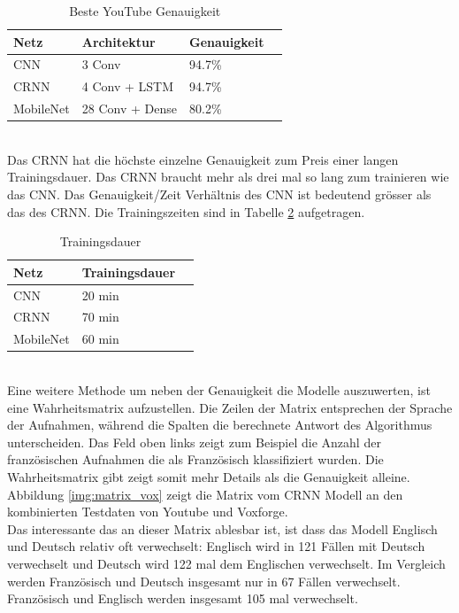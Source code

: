 \begin{table}[h]
	\centering
	\begin{tabular}{llll}
		\hline
		Netz & Architektur     & Genauigkeit  \\ \hline
		CNN  & 3 Conv          & 94.7\%       \\
		CRNN & 4 Conv + LSTM   & 94.7\%     \\
		MobileNet  & 28 Conv + Dense & 80.2\%   \\ \hline
	\end{tabular}
	\caption{Beste YouTube Genauigkeit}
	\label{table:test_you}
\end{table}
\\
Das CRNN hat die höchste einzelne Genauigkeit zum Preis einer langen Trainingsdauer. Das CRNN braucht mehr als drei mal so lang zum trainieren wie das CNN. Das Genauigkeit/Zeit Verhältnis des CNN ist bedeutend grösser als das des CRNN. Die Trainingszeiten sind in Tabelle \ref{table:test_time} aufgetragen.
\begin{table}[h]
	\centering
	\begin{tabular}{lll}
		\hline
		Netz & Trainingsdauer \\ \hline
		CNN  & 20 min \\
		CRNN & 70 min \\
		MobileNet  & 60 min\\ \hline
	\end{tabular}
	\caption{Trainingsdauer}
	\label{table:test_time}
\end{table}
\\
Eine weitere Methode um neben der Genauigkeit die Modelle auszuwerten, ist eine Wahrheitsmatrix aufzustellen. Die Zeilen der Matrix entsprechen der Sprache der Aufnahmen, während die Spalten die berechnete Antwort des Algorithmus unterscheiden. Das Feld oben links zeigt zum Beispiel die Anzahl der französischen Aufnahmen die als Französisch klassifiziert wurden. Die Wahrheitsmatrix gibt zeigt somit mehr Details als die Genauigkeit alleine. Abbildung \ref{img:matrix_vox} zeigt die Matrix vom CRNN Modell an den kombinierten Testdaten von Youtube und Voxforge.
\\
Das interessante das an dieser Matrix ablesbar ist, ist dass das Modell Englisch und Deutsch relativ oft verwechselt: Englisch wird in 121 Fällen mit Deutsch verwechselt und Deutsch wird 122 mal dem Englischen verwechselt. Im Vergleich werden Französisch und Deutsch insgesamt nur in 67 Fällen verwechselt. Französisch und Englisch werden insgesamt 105 mal verwechselt.
